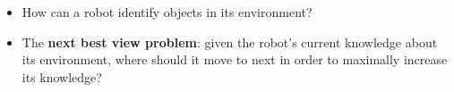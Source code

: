 
\begin{itemize}
	\item How can a robot identify objects in its environment?
	\item The \textbf{next best view problem}: given the robot's current knowledge about its environment, where should it move to next in order to maximally increase its knowledge?
\end{itemize}